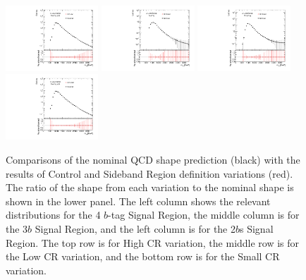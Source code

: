 \begin{figure}[htbp!]
\begin{center}
\includegraphics[angle=270, width=0.31\textwidth]{./figures/boosted/Syst_CRSB/CR_Low_compare_TwoTag_split_qcd_hh.pdf}
\includegraphics[angle=270, width=0.31\textwidth]{./figures/boosted/Syst_CRSB/CR_Small_compare_FourTag_qcd_hh.pdf}
\includegraphics[angle=270, width=0.31\textwidth]{./figures/boosted/Syst_CRSB/CR_Small_compare_ThreeTag_qcd_hh.pdf}
\includegraphics[angle=270, width=0.31\textwidth]{./figures/boosted/Syst_CRSB/CR_Small_compare_TwoTag_split_qcd_hh.pdf}
\end{center}
\caption{Comparisons of the nominal QCD shape prediction (black) with the results of Control and Sideband Region definition variations (red). The ratio of the shape from each variation to the nominal shape is shown in the lower panel. The left column shows the relevant distributions for the 4 $b$-tag Signal Region, the middle column is for the 3$b$ Signal Region, and the left column is for the 2$b$s Signal Region. The top row is for High CR variation, the middle row is for the Low CR variation, and the bottom row is for the Small CR variation.}
\label{CRSB:QCDShapeSR-CR}
\end{figure}

